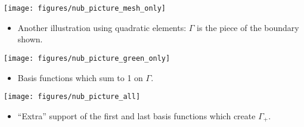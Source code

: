 \begin{frame}[t]
	  {
	    \begin{center}
	      \texttt{[image: figures/nub\_picture\_mesh\_only]}
	    \end{center}
	      \begin{itemize}
	      \item {Another illustration using quadratic
		elements: $\Gamma$ is the piece of the boundary shown.}
	      \end{itemize}
	  }

	  {
	    \begin{center}
	      \texttt{[image: figures/nub\_picture\_green\_only]}
	    \end{center}
	      \begin{itemize}
	      \item {Basis functions which sum to 1 on $\Gamma$.}
	      \end{itemize}
	  }
	  
	  {
	    \begin{center}
	      \texttt{[image: figures/nub\_picture\_all]}
	    \end{center}
	      \begin{itemize}
	      \item {``Extra'' support of the first and last basis functions which create $\Gamma_{+}$.}
	      \end{itemize}
	  }

\end{frame}
